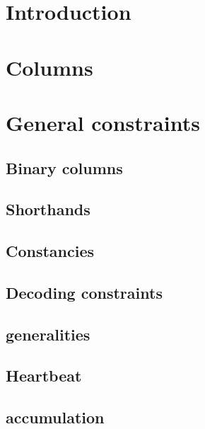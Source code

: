 \section{Introduction}                            \label{shakira: introduction}      

\section{Columns}                                 \label{shakira: columns}           

\section{General constraints}
\subsection{Binary columns}                       \label{shakira: binary}            
\subsection{Shorthands}                           \label{shakira: shorthands}        
\subsection{Constancies}                          \label{shakira: constancies}       
\subsection{Decoding constraints}                 \label{shakira: decoding}          
\subsection{\shakiraTotalSize{} generalities}     \label{shakira: total size}        
\subsection{Heartbeat}                            \label{shakira: heartbeat}         
\subsection{\nBytes{} accumulation}               \label{shakira: stamp increment}   
